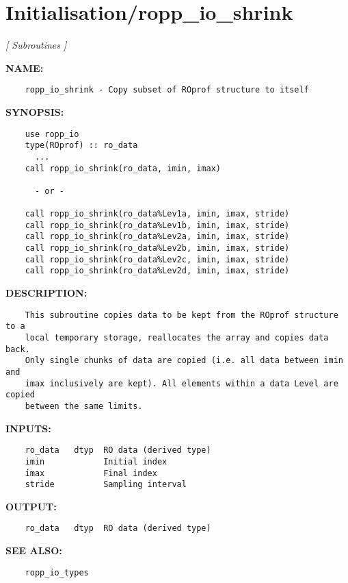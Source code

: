 \section{Initialisation/ropp\_io\_shrink}
\textsl{[ Subroutines ]}

\label{ch:robo72}
\label{ch:Initialisation_ropp_io_shrink}
\textbf{NAME:}\hspace{0.08in}\begin{Verbatim}
    ropp_io_shrink - Copy subset of ROprof structure to itself
\end{Verbatim}
\textbf{SYNOPSIS:}\hspace{0.08in}\begin{Verbatim}
    use ropp_io
    type(ROprof) :: ro_data
      ...
    call ropp_io_shrink(ro_data, imin, imax)

      - or -

    call ropp_io_shrink(ro_data%Lev1a, imin, imax, stride)
    call ropp_io_shrink(ro_data%Lev1b, imin, imax, stride)
    call ropp_io_shrink(ro_data%Lev2a, imin, imax, stride)
    call ropp_io_shrink(ro_data%Lev2b, imin, imax, stride)
    call ropp_io_shrink(ro_data%Lev2c, imin, imax, stride)
    call ropp_io_shrink(ro_data%Lev2d, imin, imax, stride)
\end{Verbatim}
\textbf{DESCRIPTION:}\hspace{0.08in}\begin{Verbatim}
    This subroutine copies data to be kept from the ROprof structure to a
    local temporary storage, reallocates the array and copies data back.
    Only single chunks of data are copied (i.e. all data between imin and
    imax inclusively are kept). All elements within a data Level are copied
    between the same limits.
\end{Verbatim}
\textbf{INPUTS:}\hspace{0.08in}\begin{Verbatim}
    ro_data   dtyp  RO data (derived type)
    imin            Initial index
    imax            Final index
    stride          Sampling interval
\end{Verbatim}
\textbf{OUTPUT:}\hspace{0.08in}\begin{Verbatim}
    ro_data   dtyp  RO data (derived type)
\end{Verbatim}
\textbf{SEE ALSO:}\hspace{0.08in}\begin{Verbatim}
    ropp_io_types
\end{Verbatim}
